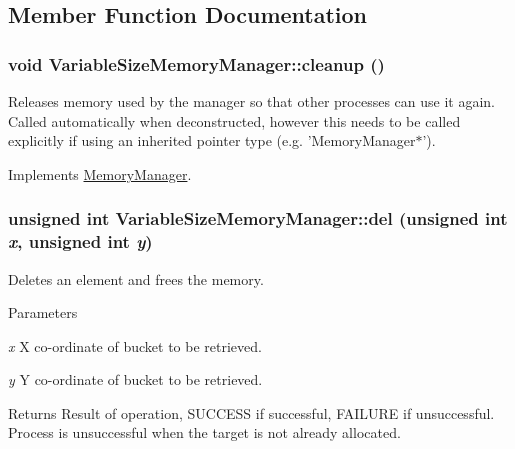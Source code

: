 \subsection{Member Function Documentation}
\hypertarget{classVariableSizeMemoryManager_a554860923dc36f775fd5037078a42aeb}{
\subsubsection[{cleanup}]{\setlength{\rightskip}{0pt plus 5cm}void VariableSizeMemoryManager::cleanup ()}}
\label{classVariableSizeMemoryManager_a554860923dc36f775fd5037078a42aeb}
Releases memory used by the manager so that other processes can use it again. Called automatically when deconstructed, however this needs to be called explicitly if using an inherited pointer type (e.g. 'MemoryManager$\ast$'). 

Implements \hyperlink{classMemoryManager_ab24d56675e49909dfa6ccc67163d9add}{MemoryManager}.

\hypertarget{classVariableSizeMemoryManager_a7fca71f5a112a22d52a8ebf7ce4984a5}{
\subsubsection[{del}]{\setlength{\rightskip}{0pt plus 5cm}unsigned int VariableSizeMemoryManager::del (unsigned int {\em x}, \/  unsigned int {\em y})}}
\label{classVariableSizeMemoryManager_a7fca71f5a112a22d52a8ebf7ce4984a5}
Deletes an element and frees the memory.


\begin{DoxyParams}{Parameters}
\item[{\em x}]X co-\/ordinate of bucket to be retrieved. \item[{\em y}]Y co-\/ordinate of bucket to be retrieved.\end{DoxyParams}
\begin{DoxyReturn}{Returns}
Result of operation, SUCCESS if successful, FAILURE if unsuccessful. Process is unsuccessful when the target is not already allocated. 
\end{DoxyReturn}


